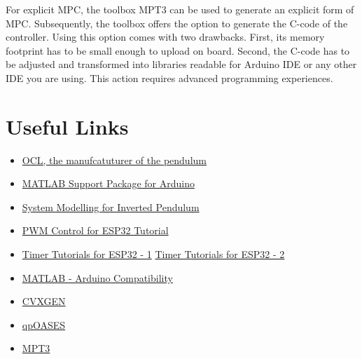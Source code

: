 \documentclass{article}
\begin{document}
For explicit MPC, the toolbox MPT3 can be used to generate an explicit form of MPC. Subsequently, the toolbox offers the option to generate the C-code of the controller. Using this option comes with two drawbacks. First, its memory footprint has to be small enough to upload on board. Second, the C-code has to be adjusted and transformed into libraries readable for Arduino IDE or any other IDE you are using. This action requires advanced programming experiences.
 

  
\newpage

\section{Useful Links}
  
\begin{itemize}
  \item \href{https://ocl.sk/}{OCL, the manufcatuturer of the pendulum}
  \item \href{https://de.mathworks.com/help/supportpkg/arduinoio/index.html?s_tid=CRUX_lftnav} {MATLAB Support Package for Arduino}
  \item \href{https://ctms.engin.umich.edu/CTMS/index.php?example=InvertedPendulum&section=SystemModeling}{System Modelling for Inverted Pendulum}
  \item \href{https://techtutorialsx.com/2017/07/01/esp32-arduino-controlling-a-buzzer-with-pwm/}{PWM Control for ESP32 Tutorial}
  \item \href{https://circuitdigest.com/microcontroller-projects/esp32-timers-and-timer-interrupts}{Timer Tutorials for ESP32 - 1}
  \href{https://espressif-docs.readthedocs-hosted.com/projects/arduino-esp32/en/latest/api/timer.html}{Timer Tutorials for ESP32 - 2}
  \item \href{https://de.mathworks.com/hardware-support/arduino-matlab.html}{MATLAB - Arduino Compatibility}
  \item \href{https://cvxgen.com/docs/index.html}{CVXGEN}
  \item \href{https://www.coin-or.org/qpOASES/doc/3.0/manual.pdf}{qpOASES}
  \item \href{https://www.mpt3.org/}{MPT3}
\end{itemize}
\end{document}
